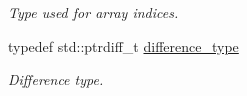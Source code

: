 \begin{DoxyCompactItemize}
\begin{DoxyCompactList}\small\item\em Type used for array indices. \item\end{DoxyCompactList}\item 
\hypertarget{classhdnum_1_1Matrix_a32f25247f12a8913e8db646c539f1dbd}{
typedef std::ptrdiff\_\-t \hyperlink{classhdnum_1_1Matrix_a32f25247f12a8913e8db646c539f1dbd}{difference\_\-type}}
\label{classhdnum_1_1Matrix_a32f25247f12a8913e8db646c539f1dbd}

\begin{DoxyCompactList}\small\item\em Difference type. \item\end{DoxyCompactList}\end{DoxyCompactItemize}
